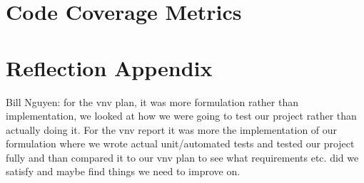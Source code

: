 \documentclass[12pt, titlepage]{article}
\begin{document}
\section{Code Coverage Metrics}

\section{Reflection Appendix}

Bill Nguyen: for the vnv plan, it was more formulation rather than implementation, we looked at how we were going to test our project rather than actually doing it. For the vnv report it was more the implementation of our formulation where we wrote actual unit/automated tests and tested our project fully and than compared it to our vnv plan to see what requirements etc. did we satisfy and maybe find things we need to improve on.




\end{document}
